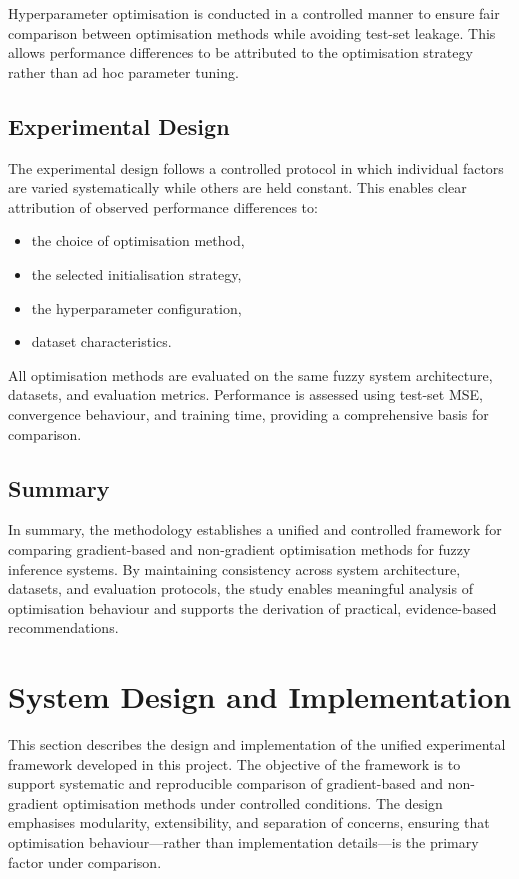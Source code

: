 \documentclass[a4paper,12pt,oneside]{article}
\begin{document}
Hyperparameter optimisation is conducted in a controlled manner to ensure fair comparison between optimisation methods while avoiding test-set leakage. This allows performance differences to be attributed to the optimisation strategy rather than ad hoc parameter tuning.

\subsection{Experimental Design}

The experimental design follows a controlled protocol in which individual factors are varied systematically while others are held constant. This enables clear attribution of observed performance differences to:
\begin{itemize}
    \item the choice of optimisation method,
    \item the selected initialisation strategy,
    \item the hyperparameter configuration,
    \item dataset characteristics.
\end{itemize}

All optimisation methods are evaluated on the same fuzzy system architecture, datasets, and evaluation metrics. Performance is assessed using test-set MSE, convergence behaviour, and training time, providing a comprehensive basis for comparison.

\subsection{Summary}

In summary, the methodology establishes a unified and controlled framework for comparing gradient-based and non-gradient optimisation methods for fuzzy inference systems. By maintaining consistency across system architecture, datasets, and evaluation protocols, the study enables meaningful analysis of optimisation behaviour and supports the derivation of practical, evidence-based recommendations.

\newpage
\section{System Design and Implementation}

This section describes the design and implementation of the unified experimental framework developed in this project. The objective of the framework is to support systematic and reproducible comparison of gradient-based and non-gradient optimisation methods under controlled conditions. The design emphasises modularity, extensibility, and separation of concerns, ensuring that optimisation behaviour---rather than implementation details---is the primary factor under comparison.
\end{document}
